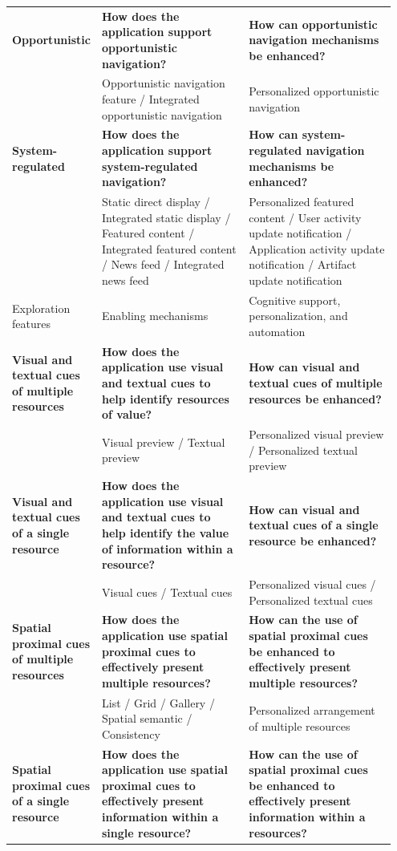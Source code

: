 \documentclass{sigchi}
\begin{document}
{\begin{table}[!htb]
\begin{tabular}{|p{0.15\linewidth}| p{0.40\linewidth}| p{0.40\linewidth}|}
\textbf{Opportunistic}          & \textbf{How does the application support opportunistic navigation?}& \textbf{How can opportunistic navigation mechanisms be enhanced?}\\
& Opportunistic navigation feature / Integrated opportunistic navigation & Personalized opportunistic navigation \\
\textbf{System-regulated}       &\textbf{How does the application support system-regulated navigation?} & \textbf{How can system-regulated navigation mechanisms be enhanced?}\\
& Static direct display / Integrated static display / Featured content / Integrated featured content / News feed / Integrated news feed & Personalized featured content / User activity update notification / Application activity update notification / Artifact update notification \\
\hline
Exploration features & Enabling mechanisms & Cognitive support, personalization, and automation \\
\hline
\textbf{Visual and textual cues of multiple resources} & \textbf{How does the application use visual and textual cues to help identify resources of value?} & \textbf{How can visual and textual cues of multiple resources be enhanced?}\\
& Visual preview / Textual preview & Personalized visual preview / Personalized textual preview \\
\textbf{Visual and textual cues of a single resource} & \textbf{How does the application use visual and textual cues to help identify the value of information within a resource?} & \textbf{How can visual and textual cues of a single resource be enhanced?}\\
& Visual cues / Textual cues & Personalized visual cues / Personalized textual cues \\                
\textbf{Spatial proximal cues of multiple resources} & \textbf{How does the application use spatial proximal cues to effectively present multiple resources?} & \textbf{How can the use of spatial proximal cues be enhanced to effectively present multiple resources?}\\
& List / Grid / Gallery / Spatial semantic / Consistency & Personalized arrangement of multiple resources\\
\textbf{Spatial proximal cues of a single resource} & \textbf{How does the application use spatial proximal cues to effectively present information within a single resource?} & \textbf{How can the use of spatial proximal cues be enhanced to effectively present information within a resources?}\\

\end{tabular}
\end{table}}
\end{document}
